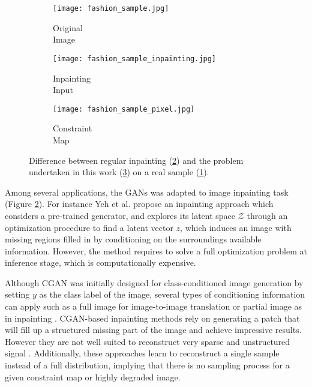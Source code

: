 \begin{figure}[t]
	\centering
	\begin{subfigure}[t]{0.33\textwidth}
		\centering
		\texttt{[image: fashion\_sample.jpg]}
		\caption{Original \\ Image}
		\label{fig:digit}
	\end{subfigure}\begin{subfigure}[t]{0.33\textwidth}
		\centering
		\texttt{[image: fashion\_sample\_inpainting.jpg]}
		\caption{Inpainting\\Input}
		\label{fig:inpainting}
	\end{subfigure}\begin{subfigure}[t]{0.33\textwidth}
		\centering
		\texttt{[image: fashion\_sample\_pixel.jpg]}
		\caption{Constraint\\Map}
		\label{fig:pixelwise_gen}
	\end{subfigure}
	\caption{Difference between regular inpainting (\ref{fig:inpainting}) and the problem undertaken in this work (\ref{fig:pixelwise_gen}) on a real sample (\ref{fig:digit}).}
	\label{fig:image_completion_task}
\end{figure}


Among several applications, the GANs was adapted  to image inpainting task (Figure \ref{fig:inpainting}). For instance Yeh et al. \citep{Yeh2017} propose an inpainting approach which considers a pre-trained generator, and explores its latent space $\mathcal{Z}$ through an optimization procedure to find a latent vector $z$, which induces an image with missing regions filled in by conditioning on the surroundings available information. However, the method requires to solve a full optimization problem at inference stage, which is computationally expensive.

Although CGAN was initially designed for class-conditioned image generation by setting $y$ as the class label of the image, several types of conditioning information can apply such as a full image for image-to-image translation \citep{Isola2017} or partial image as in inpainting \citep{Yu2018}. CGAN-based inpainting methods rely on generating a patch that will fill up a structured missing part of the image and achieve impressive results. However they are not well suited to reconstruct very sparse and unstructured signal \citep{Demir2018}. Additionally, these approaches learn to reconstruct a single sample instead of a full distribution, implying that there is no sampling process for a given constraint map or highly degraded image.

